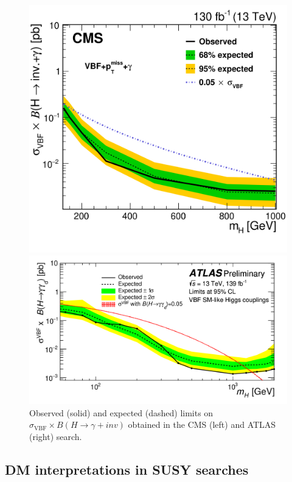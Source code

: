 \documentclass{moriond}
\begin{document}
\begin{figure} [htb]
\begin{minipage}{0.45\linewidth}
\centerline{\includegraphics[width=0.9\linewidth]{cmsvbf}}
\end{minipage}
\begin{minipage}{0.45\linewidth}
\centerline{\includegraphics[width=0.9\linewidth]{atlasvbf}}
\end{minipage}
\caption[]{Observed (solid) and expected (dashed) limits on $\sigma_{\textrm{VBF}}\times B(H\rightarrow\gamma+inv)$ obtained in the CMS (left) and ATLAS (right) search.}
\label{fig:vbf}
\end{figure}

\subsection{DM interpretations in SUSY searches}
\end{document}
